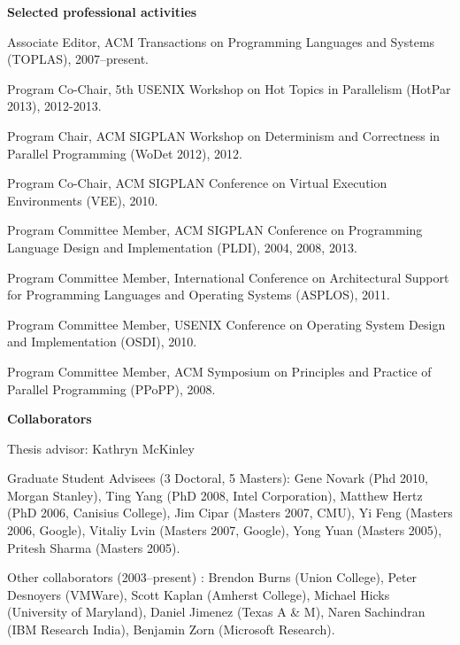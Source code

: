 \documentclass[11pt]{article}
\begin{document}
\begin{description}
\setlength{\labelsep}{0ex}
\setlength{\itemsep}{-0.5ex}

\item {\bf\textsf{Selected professional activities}}

\item Associate Editor, ACM Transactions on Programming Languages and Systems (TOPLAS), 2007--present.
\item Program Co-Chair, 5th USENIX Workshop on Hot Topics in Parallelism (HotPar 2013), 2012-2013.
\item Program Chair, ACM SIGPLAN Workshop on Determinism and Correctness in Parallel Programming (WoDet 2012), 2012.
\item Program Co-Chair, ACM SIGPLAN Conference on Virtual Execution Environments (VEE), 2010.
\item Program Committee Member, ACM SIGPLAN Conference on Programming Language Design and Implementation (PLDI), 2004, 2008, 2013.
\item Program Committee Member, International Conference on Architectural Support for Programming Languages and Operating Systems (ASPLOS), 2011.
\item Program Committee Member, USENIX Conference on Operating System Design and Implementation (OSDI), 2010.
\item Program Committee Member, ACM Symposium on Principles and Practice of Parallel Programming (PPoPP), 2008.

\end{description}

\begin{description}
\setlength{\labelsep}{0ex}
\setlength{\itemsep}{-0.5ex}

\item {\bf\textsf{Collaborators}}

\item { Thesis advisor}: Kathryn McKinley

\item { Graduate Student Advisees} (3 Doctoral, 5 Masters): Gene Novark (Phd 2010, Morgan Stanley), Ting Yang (PhD 2008, Intel Corporation), Matthew Hertz (PhD 2006, Canisius College), Jim Cipar (Masters 2007, CMU), Yi Feng (Masters 2006, Google), Vitaliy Lvin (Masters 2007, Google), Yong Yuan (Masters 2005), Pritesh Sharma (Masters 2005).

\item {Other collaborators (2003--present)} : Brendon Burns (Union College), Peter Desnoyers (VMWare), Scott Kaplan (Amherst College), Michael Hicks (University of Maryland), Daniel Jimenez (Texas A \& M), Naren Sachindran (IBM Research India), Benjamin Zorn (Microsoft Research).

\end{description}
\end{document}
